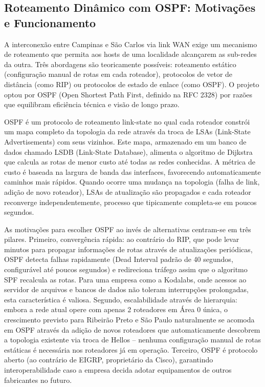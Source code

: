 \documentclass[12pt,a4paper]{article}
\begin{document}
\subsection{Roteamento Dinâmico com OSPF: Motivações e Funcionamento}

A interconexão entre Campinas e São Carlos via link WAN exige um mecanismo de roteamento que permita aos hosts de uma localidade alcançarem as sub-redes da outra. Três abordagens são teoricamente possíveis: roteamento estático (configuração manual de rotas em cada roteador), protocolos de vetor de distância (como RIP) ou protocolos de estado de enlace (como OSPF). O projeto optou por OSPF (Open Shortest Path First, definido na RFC 2328) por razões que equilibram eficiência técnica e visão de longo prazo.

OSPF é um protocolo de roteamento link-state no qual cada roteador constrói um mapa completo da topologia da rede através da troca de LSAs (Link-State Advertisements) com seus vizinhos. Este mapa, armazenado em um banco de dados chamado LSDB (Link-State Database), alimenta o algoritmo de Dijkstra que calcula as rotas de menor custo até todas as redes conhecidas. A métrica de custo é baseada na largura de banda das interfaces, favorecendo automaticamente caminhos mais rápidos. Quando ocorre uma mudança na topologia (falha de link, adição de novo roteador), LSAs de atualização são propagados e cada roteador reconverge independentemente, processo que tipicamente completa-se em poucos segundos.

As motivações para escolher OSPF ao invés de alternativas centram-se em três pilares. Primeiro, convergência rápida: ao contrário do RIP, que pode levar minutos para propagar informações de rotas através de atualizações periódicas, OSPF detecta falhas rapidamente (Dead Interval padrão de 40 segundos, configurável até poucos segundos) e redireciona tráfego assim que o algoritmo SPF recalcula as rotas. Para uma empresa como a Kodalabs, onde acessos ao servidor de arquivos e bancos de dados não toleram interrupções prolongadas, esta característica é valiosa. Segundo, escalabilidade através de hierarquia: embora a rede atual opere com apenas 2 roteadores em Área 0 única, o crescimento previsto para Ribeirão Preto e São Paulo naturalmente se acomoda em OSPF através da adição de novos roteadores que automaticamente descobrem a topologia existente via troca de Hellos -- nenhuma configuração manual de rotas estáticas é necessária nos roteadores já em operação. Terceiro, OSPF é protocolo aberto (ao contrário de EIGRP, proprietário da Cisco), garantindo interoperabilidade caso a empresa decida adotar equipamentos de outros fabricantes no futuro.
\end{document}
